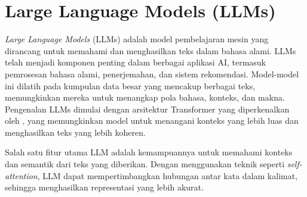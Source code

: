 \section{Large Language Models (LLMs)}
\label{sec:llms}

\textit{Large Language Models} (LLMs) adalah model pembelajaran mesin yang dirancang untuk memahami dan menghasilkan teks dalam bahasa alami. LLMs telah menjadi komponen penting dalam berbagai aplikasi AI, termasuk pemrosesan bahasa alami, penerjemahan, dan sistem rekomendasi. Model-model ini dilatih pada kumpulan data besar yang mencakup berbagai teks, memungkinkan mereka untuk menangkap pola bahasa, konteks, dan makna. Pengenalan LLMs dimulai dengan arsitektur Transformer yang diperkenalkan oleh \textcite{vaswani2023attentionneed}, yang memungkinkan model untuk menangani konteks yang lebih luas dan menghasilkan teks yang lebih koheren.

Salah satu fitur utama LLM adalah kemampuannya untuk memahami konteks dan semantik dari teks yang diberikan. Dengan menggunakan teknik seperti \textit{self-attention}, LLM dapat mempertimbangkan hubungan antar kata dalam kalimat, sehingga menghasilkan representasi yang lebih akurat. 